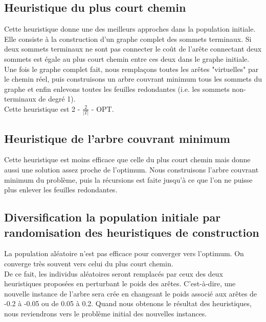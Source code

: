\documentclass[12pt,a4paper]{article}
\begin{document}
\subsection{Heuristique du plus court chemin}
Cette heuristique donne une des meilleurs approches dans la population initiale. Elle consiste à la construction d'un graphe complet des sommets terminaux. Si deux sommets terminaux ne sont pas connecter le coût de l'arête connectant deux sommets est égale au plus court chemin entre ces deux dans le graphe initiale. Une fois le graphe complet fait, nous remplaçons toutes les arêtes "virtuelles" par le chemin réel, puis construisons un arbre couvrant minimum tous les sommets du graphe et enfin enlevons toutes les feuilles redondantes (i.e. les sommets non-terminaux de degré 1).\\
Cette heuristique est 2 - $\frac{2}{|T|}$ - OPT.
\subsection{Heuristique de l'arbre couvrant minimum}
Cette heuristique est moins efficace que celle du plus court chemin mais donne aussi une solution assez proche de l'optimum. Nous construisons l'arbre couvrant minimum du problème, puis la récursions est faite jusqu'à ce que l'on ne puisse plus enlever les feuilles redondantes.
\subsection{Diversification la population initiale par randomisation des heuristiques de construction}
La population aléatoire n'est pas efficace pour converger vers l'optimum. On converge très souvent vers celui du plus court chemin.\\
De ce fait, les individus aléatoires seront remplacés par ceux des deux heuristiques proposées en perturbant le poids des arêtes. C'est-à-dire, une nouvelle instance de l'arbre sera crée en changeant le poids associé aux arêtes de -0.2 à -0.05 ou de 0.05 à 0.2. Quand nous obtenons le résultat des heuristiques, nous reviendrons vers le problème initial des nouvelles instances.
\end{document}
